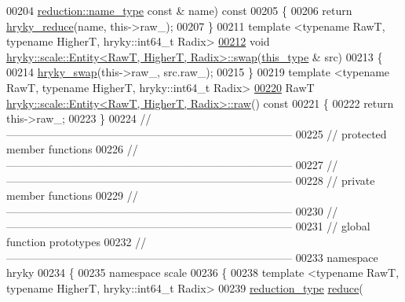 \begin{DoxyCode}
00204     \hyperlink{classhryky_1_1reduction_1_1_string}{reduction::name_type} \textcolor{keyword}{const} & name)\textcolor{keyword}{ const}
00205 \textcolor{keyword}{}\{
00206     \textcolor{keywordflow}{return} \hyperlink{reduction__common_8h_afc72326c9900838c5db40438318794dd}{hryky_reduce}(name, this->raw\_);
00207 \}
00211 \textcolor{keyword}{template} <\textcolor{keyword}{typename} RawT, \textcolor{keyword}{typename} HigherT, hryky::\textcolor{keywordtype}{int}64\_t Radix>
\hypertarget{scale__entity_8h_source_l00212}{}\hyperlink{classhryky_1_1scale_1_1_entity_a8ec8cc49ba0fd7e19cfe2ed714d62663}{00212} \textcolor{keywordtype}{void} \hyperlink{namespacehryky_1_1scale_ae4a4f26481f5a12c26e0d3c93f1d1bbc}{hryky::scale::Entity<RawT, HigherT, Radix>::swap}(\hyperlink{classhryky_1_1scale_1_1_entity}{this_type} & src)
00213 \{
00214     \hyperlink{namespacehryky_add9c1c1fdfda07cd47bcb7c16d3a823a}{hryky_swap}(this->raw\_, src.raw\_);
00215 \}
00219 \textcolor{keyword}{template} <\textcolor{keyword}{typename} RawT, \textcolor{keyword}{typename} HigherT, hryky::\textcolor{keywordtype}{int}64\_t Radix>
\hypertarget{scale__entity_8h_source_l00220}{}\hyperlink{classhryky_1_1scale_1_1_entity_ac9d555edcbc0d8f8369f386a7b4d4d0f}{00220} RawT \hyperlink{classhryky_1_1scale_1_1_entity}{hryky::scale::Entity<RawT, HigherT, Radix>::raw}()\textcolor{keyword}{ const}
00221 \textcolor{keyword}{}\{
00222     \textcolor{keywordflow}{return} this->raw\_;
00223 \}
00224 \textcolor{comment}{//
      ------------------------------------------------------------------------------}
00225 \textcolor{comment}{// protected member functions}
00226 \textcolor{comment}{//
      ------------------------------------------------------------------------------}
00227 \textcolor{comment}{//
      ------------------------------------------------------------------------------}
00228 \textcolor{comment}{// private member functions}
00229 \textcolor{comment}{//
      ------------------------------------------------------------------------------}
00230 \textcolor{comment}{//
      ------------------------------------------------------------------------------}
00231 \textcolor{comment}{// global function prototypes}
00232 \textcolor{comment}{//
      ------------------------------------------------------------------------------}
00233 \textcolor{keyword}{namespace }hryky
00234 \{
00235 \textcolor{keyword}{namespace }scale
00236 \{
00238     \textcolor{keyword}{template} <\textcolor{keyword}{typename} RawT, \textcolor{keyword}{typename} HigherT, hryky::\textcolor{keywordtype}{int}64\_t Radix>
00239     \hyperlink{classhryky_1_1_intrusive_ptr}{reduction_type} \hyperlink{namespacehryky_1_1scale_a6bbb1a80e433741768d3590c888ff644}{reduce}(

\end{DoxyCode}
